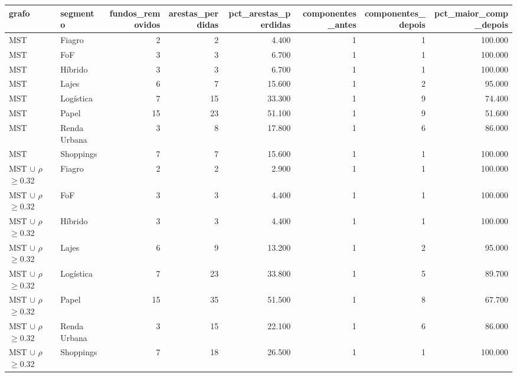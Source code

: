 \begin{tabular}{llrrrrrr}
\toprule
grafo & segmento & fundos\_removidos & arestas\_perdidas & pct\_arestas\_perdidas & componentes\_antes & componentes\_depois & pct\_maior\_comp\_depois \\
\midrule
MST & Fiagro & 2 & 2 & 4.400 & 1 & 1 & 100.000 \\
MST & FoF & 3 & 3 & 6.700 & 1 & 1 & 100.000 \\
MST & Híbrido & 3 & 3 & 6.700 & 1 & 1 & 100.000 \\
MST & Lajes & 6 & 7 & 15.600 & 1 & 2 & 95.000 \\
MST & Logística & 7 & 15 & 33.300 & 1 & 9 & 74.400 \\
MST & Papel & 15 & 23 & 51.100 & 1 & 9 & 51.600 \\
MST & Renda Urbana & 3 & 8 & 17.800 & 1 & 6 & 86.000 \\
MST & Shoppings & 7 & 7 & 15.600 & 1 & 1 & 100.000 \\
MST $\cup$ $\rho$$\geq$0.32 & Fiagro & 2 & 2 & 2.900 & 1 & 1 & 100.000 \\
MST $\cup$ $\rho$$\geq$0.32 & FoF & 3 & 3 & 4.400 & 1 & 1 & 100.000 \\
MST $\cup$ $\rho$$\geq$0.32 & Híbrido & 3 & 3 & 4.400 & 1 & 1 & 100.000 \\
MST $\cup$ $\rho$$\geq$0.32 & Lajes & 6 & 9 & 13.200 & 1 & 2 & 95.000 \\
MST $\cup$ $\rho$$\geq$0.32 & Logística & 7 & 23 & 33.800 & 1 & 5 & 89.700 \\
MST $\cup$ $\rho$$\geq$0.32 & Papel & 15 & 35 & 51.500 & 1 & 8 & 67.700 \\
MST $\cup$ $\rho$$\geq$0.32 & Renda Urbana & 3 & 15 & 22.100 & 1 & 6 & 86.000 \\
MST $\cup$ $\rho$$\geq$0.32 & Shoppings & 7 & 18 & 26.500 & 1 & 1 & 100.000 \\
\bottomrule
\end{tabular}
